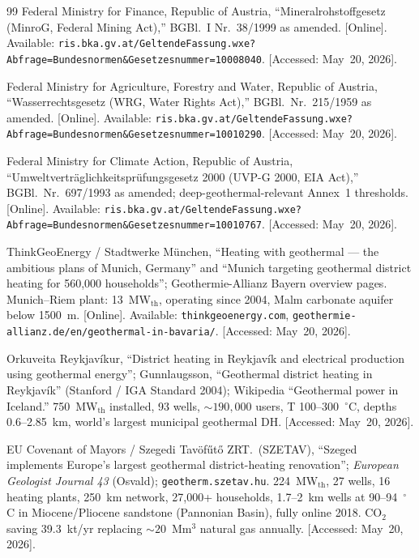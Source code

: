 \documentclass{article}
\begin{document}
\begin{thebibliography}{99}
Federal Ministry for Finance, Republic of Austria, ``Mineralrohstoffgesetz
(MinroG, Federal Mining Act),'' BGBl.\ I Nr.\ 38/1999 as amended.
[Online]. Available: \texttt{ris.bka.gv.at/GeltendeFassung.wxe?Abfrage=Bundesnormen\&Gesetzesnummer=10008040}.
[Accessed: May~20, 2026].

Federal Ministry for Agriculture, Forestry and Water, Republic of Austria,
``Wasserrechtsgesetz (WRG, Water Rights Act),'' BGBl.\ Nr.\ 215/1959 as amended.
[Online]. Available: \texttt{ris.bka.gv.at/GeltendeFassung.wxe?Abfrage=Bundesnormen\&Gesetzesnummer=10010290}.
[Accessed: May~20, 2026].

Federal Ministry for Climate Action, Republic of Austria,
``Umweltvertr\"aglichkeitspr\"ufungsgesetz 2000 (UVP-G 2000,
EIA Act),'' BGBl.\ Nr.\ 697/1993 as amended; deep-geothermal-relevant
Annex~1 thresholds. [Online]. Available:
\texttt{ris.bka.gv.at/GeltendeFassung.wxe?Abfrage=Bundesnormen\&Gesetzesnummer=10010767}.
[Accessed: May~20, 2026].

ThinkGeoEnergy / Stadtwerke M\"unchen, ``Heating with geothermal ---
the ambitious plans of Munich, Germany'' and ``Munich targeting
geothermal district heating for 560,000 households''; Geothermie-Allianz
Bayern overview pages. Munich--Riem plant: 13~MW$_{\mathrm{th}}$,
operating since 2004, Malm carbonate aquifer below 1500~m.
[Online]. Available: \texttt{thinkgeoenergy.com}, \texttt{geothermie-allianz.de/en/geothermal-in-bavaria/}.
[Accessed: May~20, 2026].

Orkuveita Reykjav\'ikur, ``District heating in Reykjav\'ik and electrical
production using geothermal energy''; Gunnlaugsson, ``Geothermal
district heating in Reykjav\'ik'' (Stanford / IGA Standard 2004);
Wikipedia ``Geothermal power in Iceland.'' 750~MW$_{\mathrm{th}}$
installed, 93 wells, $\sim 190{,}000$ users, T 100--300~$^\circ$C,
depths 0.6--2.85~km, world's largest municipal geothermal DH.
[Accessed: May~20, 2026].

EU Covenant of Mayors / Szegedi Tav\"of\H{u}t\H{o} ZRT.\ (SZETAV),
``Szeged implements Europe's largest geothermal district-heating
renovation''; \emph{European Geologist Journal 43} (Osvald);
\texttt{geotherm.szetav.hu}. 224~MW$_{\mathrm{th}}$, 27 wells, 16
heating plants, 250~km network, 27{,}000+ households, 1.7--2~km wells
at 90--94~$^\circ$C in Miocene/Pliocene sandstone (Pannonian Basin),
fully online 2018. CO$_2$ saving 39.3~kt/yr replacing $\sim 20$~Mm$^3$
natural gas annually.
[Accessed: May~20, 2026].


\end{thebibliography}
\end{document}

